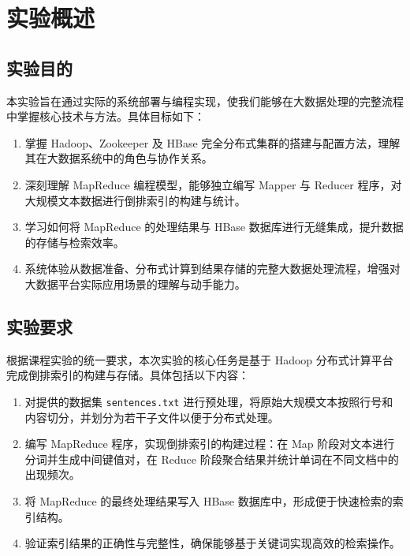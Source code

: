 \documentclass[]{bitreport}
\begin{document}
\MakeCover

\cleardoublepage
{}
\tableofcontents
\clearpage
{}
\setcounter{page}{1}

\section{实验概述}

\subsection{实验目的}

本实验旨在通过实际的系统部署与编程实现，使我们能够在大数据处理的完整流程中掌握核心技术与方法。具体目标如下：

\begin{enumerate}
  \item 掌握 Hadoop、Zookeeper 及 HBase 完全分布式集群的搭建与配置方法，理解其在大数据系统中的角色与协作关系。
  \item 深刻理解 MapReduce 编程模型，能够独立编写 Mapper 与 Reducer 程序，对大规模文本数据进行倒排索引的构建与统计。
  \item 学习如何将 MapReduce 的处理结果与 HBase 数据库进行无缝集成，提升数据的存储与检索效率。
  \item 系统体验从数据准备、分布式计算到结果存储的完整大数据处理流程，增强对大数据平台实际应用场景的理解与动手能力。
\end{enumerate}


\subsection{实验要求}

根据课程实验的统一要求，本次实验的核心任务是基于 Hadoop 分布式计算平台完成倒排索引的构建与存储。具体包括以下内容：

\begin{enumerate}
  \item 对提供的数据集 \texttt{sentences.txt} 进行预处理，将原始大规模文本按照行号和内容切分，并划分为若干子文件以便于分布式处理。
  \item 编写 MapReduce 程序，实现倒排索引的构建过程：在 Map 阶段对文本进行分词并生成中间键值对，在 Reduce 阶段聚合结果并统计单词在不同文档中的出现频次。
  \item 将 MapReduce 的最终处理结果写入 HBase 数据库中，形成便于快速检索的索引结构。
  \item 验证索引结果的正确性与完整性，确保能够基于关键词实现高效的检索操作。
\end{enumerate}
\end{document}
